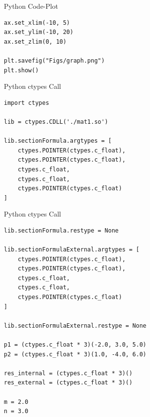 \documentclass{beamer}
\begin{document}
\begin{frame}[fragile]{Python Code-Plot}
\begin{verbatim}
ax.set_xlim(-10, 5)
ax.set_ylim(-10, 20)
ax.set_zlim(0, 10)

plt.savefig("Figs/graph.png")
plt.show()
\end{verbatim}
\end{frame}


\begin{frame}[fragile]{Python ctypes Call}
\begin{verbatim}
import ctypes

lib = ctypes.CDLL('./mat1.so')

lib.sectionFormula.argtypes = [
    ctypes.POINTER(ctypes.c_float),
    ctypes.POINTER(ctypes.c_float),
    ctypes.c_float,
    ctypes.c_float,
    ctypes.POINTER(ctypes.c_float)
]
\end{verbatim}
\end{frame}

\begin{frame}[fragile]{Python ctypes Call}
\begin{verbatim}
lib.sectionFormula.restype = None

lib.sectionFormulaExternal.argtypes = [
    ctypes.POINTER(ctypes.c_float),
    ctypes.POINTER(ctypes.c_float),
    ctypes.c_float,
    ctypes.c_float,
    ctypes.POINTER(ctypes.c_float)
]

lib.sectionFormulaExternal.restype = None

p1 = (ctypes.c_float * 3)(-2.0, 3.0, 5.0)
p2 = (ctypes.c_float * 3)(1.0, -4.0, 6.0)

res_internal = (ctypes.c_float * 3)()
res_external = (ctypes.c_float * 3)()

m = 2.0
n = 3.0
\end{verbatim}
\end{frame}
\end{document}
